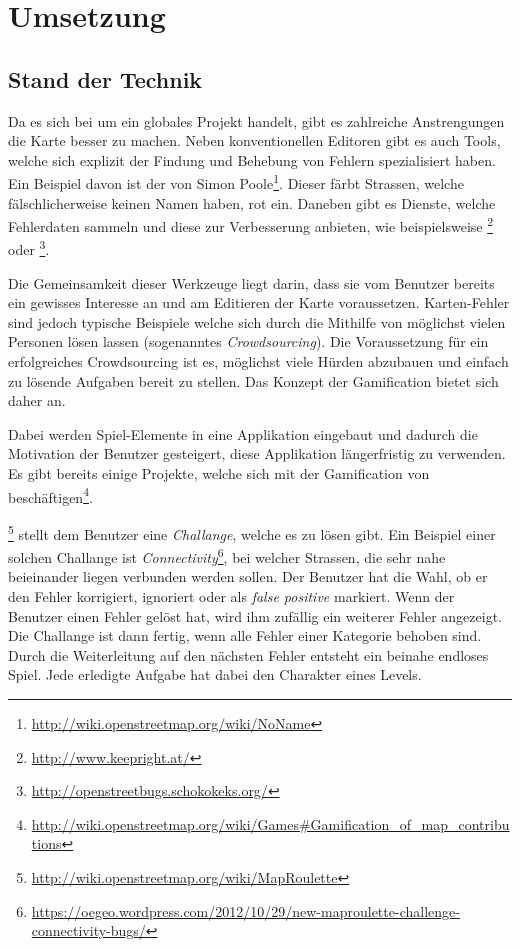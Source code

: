 \chapter{Umsetzung}
\label{umsetzung}

\section{Stand der Technik}
Da es sich bei  um ein globales Projekt handelt, gibt es zahlreiche Anstrengungen die Karte besser zu machen.
Neben konventionellen Editoren gibt es auch Tools, welche sich explizit der Findung und Behebung von Fehlern spezialisiert haben.
Ein Beispiel davon ist der  von Simon Poole\footnote{\url{http://wiki.openstreetmap.org/wiki/NoName}}. Dieser färbt Strassen, welche fälschlicherweise keinen Namen haben, rot ein.
Daneben gibt es Dienste, welche Fehlerdaten sammeln und diese zur Verbesserung anbieten, wie beispielsweise \footnote{\url{http://www.keepright.at/}} oder \footnote{\url{http://openstreetbugs.schokokeks.org/}}.

Die Gemeinsamkeit dieser Werkzeuge liegt darin, dass sie vom Benutzer bereits ein gewisses Interesse an  und am Editieren der Karte voraussetzen.
Karten-Fehler sind jedoch typische Beispiele welche sich durch die Mithilfe von möglichst vielen Personen lösen lassen (sogenanntes \emph{\gls{Crowdsourcing}}).
Die Voraussetzung für ein erfolgreiches Crowdsourcing ist es, möglichst viele Hürden abzubauen und einfach zu lösende Aufgaben bereit zu stellen.
Das Konzept der \gls{Gamification} bietet sich daher an.

Dabei werden Spiel-Elemente in eine Applikation eingebaut und dadurch die Motivation der Benutzer gesteigert, diese Applikation längerfristig zu verwenden.
Es gibt bereits einige Projekte, welche sich mit der \gls{Gamification} von  beschäftigen\footnote{\url{http://wiki.openstreetmap.org/wiki/Games\#Gamification_of_map_contributions}}.

\footnote{\url{http://wiki.openstreetmap.org/wiki/MapRoulette}} stellt dem Benutzer eine \emph{Challange}, welche es zu lösen gibt.
Ein Beispiel einer solchen Challange ist \emph{Connectivity}\footnote{\url{https://oegeo.wordpress.com/2012/10/29/new-maproulette-challenge-connectivity-bugs/}}, bei welcher Strassen, die sehr nahe beieinander liegen verbunden werden sollen.
Der Benutzer hat die Wahl, ob er den Fehler korrigiert, ignoriert oder als \emph{false positive} markiert.
Wenn der Benutzer einen Fehler gelöst hat, wird ihm zufällig ein weiterer Fehler angezeigt.
Die Challange ist dann fertig, wenn alle Fehler einer Kategorie behoben sind.
Durch die Weiterleitung auf den nächsten Fehler entsteht ein beinahe endloses Spiel. Jede erledigte Aufgabe hat dabei den Charakter eines Levels.


